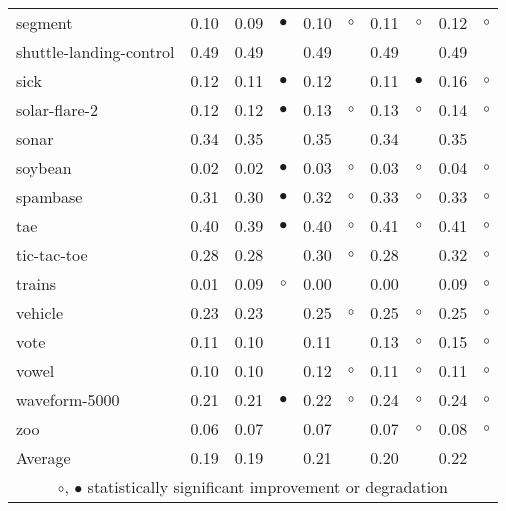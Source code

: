 {\begin{longtable}{lrr@{\hspace{0.1cm}}cr@{\hspace{0.1cm}}cr@{\hspace{0.1cm}}cr@{\hspace{0.1cm}}c}
segment & 0.10 & 0.09 & $\bullet$ & 0.10 &   $\circ$ & 0.11 &   $\circ$ & 0.12 &  $\circ$\\
shuttle-landing-control & 0.49 & 0.49 &           & 0.49 &           & 0.49 &           & 0.49 &         \\
sick & 0.12 & 0.11 & $\bullet$ & 0.12 &           & 0.11 & $\bullet$ & 0.16 &  $\circ$\\
solar-flare-2 & 0.12 & 0.12 & $\bullet$ & 0.13 &   $\circ$ & 0.13 &   $\circ$ & 0.14 &  $\circ$\\
sonar & 0.34 & 0.35 &           & 0.35 &           & 0.34 &           & 0.35 &         \\
soybean & 0.02 & 0.02 & $\bullet$ & 0.03 &   $\circ$ & 0.03 &   $\circ$ & 0.04 &  $\circ$\\
spambase & 0.31 & 0.30 & $\bullet$ & 0.32 &   $\circ$ & 0.33 &   $\circ$ & 0.33 &  $\circ$\\
tae & 0.40 & 0.39 & $\bullet$ & 0.40 &   $\circ$ & 0.41 &   $\circ$ & 0.41 &  $\circ$\\
tic-tac-toe & 0.28 & 0.28 &           & 0.30 &   $\circ$ & 0.28 &           & 0.32 &  $\circ$\\
trains & 0.01 & 0.09 &   $\circ$ & 0.00 &           & 0.00 &           & 0.09 &  $\circ$\\
vehicle & 0.23 & 0.23 &           & 0.25 &   $\circ$ & 0.25 &   $\circ$ & 0.25 &  $\circ$\\
vote & 0.11 & 0.10 &           & 0.11 &           & 0.13 &   $\circ$ & 0.15 &  $\circ$\\
vowel & 0.10 & 0.10 &           & 0.12 &   $\circ$ & 0.11 &   $\circ$ & 0.11 &  $\circ$\\
waveform-5000 & 0.21 & 0.21 & $\bullet$ & 0.22 &   $\circ$ & 0.24 &   $\circ$ & 0.24 &  $\circ$\\
zoo & 0.06 & 0.07 &           & 0.07 &           & 0.07 &   $\circ$ & 0.08 &  $\circ$\\
\hline
Average & 0.19 & 0.19 &           & 0.21 &           & 0.20 &           & 0.22 &         \\
\hline
\multicolumn{10}{c}{$\circ$, $\bullet$ statistically significant improvement or degradation}\\
\end{longtable} \footnotesize \par}
